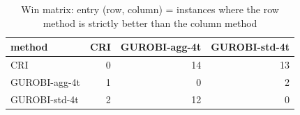 \begin{table}[htbp]
\centering
\small
\caption{Win matrix: entry (row, column) = instances where the row method is strictly better than the column method}
\label{tab:E7_gurobi_threads_b10_wins}
\begin{tabular}{lrrr}
\toprule
method & CRI & GUROBI-agg-4t & GUROBI-std-4t \\
\midrule
CRI & 0 & 14 & 13 \\
GUROBI-agg-4t & 1 & 0 & 2 \\
GUROBI-std-4t & 2 & 12 & 0 \\
\bottomrule
\end{tabular}
\end{table}
